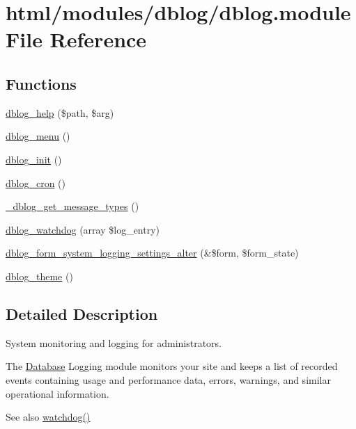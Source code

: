 \hypertarget{dblog_8module}{
\section{html/modules/dblog/dblog.module File Reference}
\label{dblog_8module}
}
\subsection*{Functions}
\begin{DoxyCompactItemize}
\item 
\hyperlink{dblog_8module_abda6b8b94cbe15aeb338ed16f5093039}{dblog\_\-help} (\$path, \$arg)
\item 
\hyperlink{dblog_8module_ac599cb2337e45bf5268f593e84039684}{dblog\_\-menu} ()
\item 
\hyperlink{dblog_8module_a2c66f1df8be0d5bc33f964b3037eb531}{dblog\_\-init} ()
\item 
\hyperlink{dblog_8module_a19bb31e148bfbf3f76344cd9f7672f73}{dblog\_\-cron} ()
\item 
\hyperlink{dblog_8module_af0ae00c02019af60bf16b047cdf63bed}{\_\-dblog\_\-get\_\-message\_\-types} ()
\item 
\hyperlink{dblog_8module_a955d567c291007c363af583187581e96}{dblog\_\-watchdog} (array \$log\_\-entry)
\item 
\hyperlink{dblog_8module_abb38bc8935acc2b65b46bb556494b10f}{dblog\_\-form\_\-system\_\-logging\_\-settings\_\-alter} (\&\$form, \$form\_\-state)
\item 
\hyperlink{dblog_8module_ab4d2846fc313033d586436ed508939f5}{dblog\_\-theme} ()
\end{DoxyCompactItemize}


\subsection{Detailed Description}
System monitoring and logging for administrators.

The \hyperlink{classDatabase}{Database} Logging module monitors your site and keeps a list of recorded events containing usage and performance data, errors, warnings, and similar operational information.

\begin{DoxySeeAlso}{See also}
\hyperlink{bootstrap_8inc_acb7338e6740302727043d64e3ae1257b}{watchdog()} 
\end{DoxySeeAlso}


